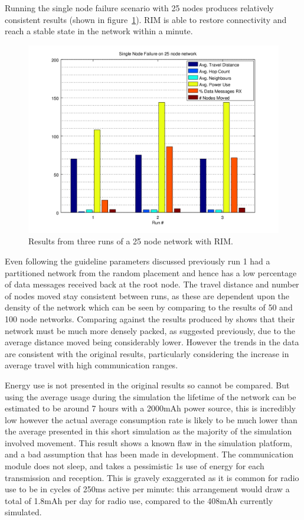 \documentclass[authoryearcitations]{UoYCSproject}
\begin{document}
Running the single node failure scenario with 25 nodes produces relatively consistent results (shown in figure~\ref{fig:singlefail_25node}). RIM is able to restore connectivity and reach a stable state in the network within a minute.

\begin{figure}
 \centering
    \includegraphics[width=\textwidth]{figures/singlefail_25node.png}
    \caption{Results from three runs of a 25 node network with RIM.}
    \label{fig:singlefail_25node}
\end{figure}

Even following the guideline parameters discussed previously run 1 had a partitioned network from the random placement and hence has a low percentage of data messages received back at the root node. The travel distance and number of nodes moved stay consistent between runs, as these are dependent upon the density of the network which can be seen by comparing to the results of 50 and 100 node networks. Comparing against the results produced by \citeauthor*{Younis2010} shows that their network must be much more densely packed, as suggested previously, due to the average distance moved being considerably lower. However the trends in the data are consistent with the original results, particularly considering the increase in average travel with high communication ranges.

Energy use is not presented in the original results so cannot be compared. But using the average usage during the simulation the lifetime of the network can be estimated to be around 7 hours with a 2000mAh power source, this is incredibly low however the actual average consumption rate is likely to be much lower than the average presented in this short simulation as the majority of the simulation involved movement. This result shows a known flaw in the simulation platform, and a bad assumption that has been made in development. The communication module does not sleep, and takes a pessimistic 1s use of energy for each transmission and reception. This is gravely exaggerated as it is common for radio use to be in cycles of 250ms active per minute: this arrangement would draw a total of 1.8mAh per day for radio use, compared to the 408mAh currently simulated.
\end{document}
